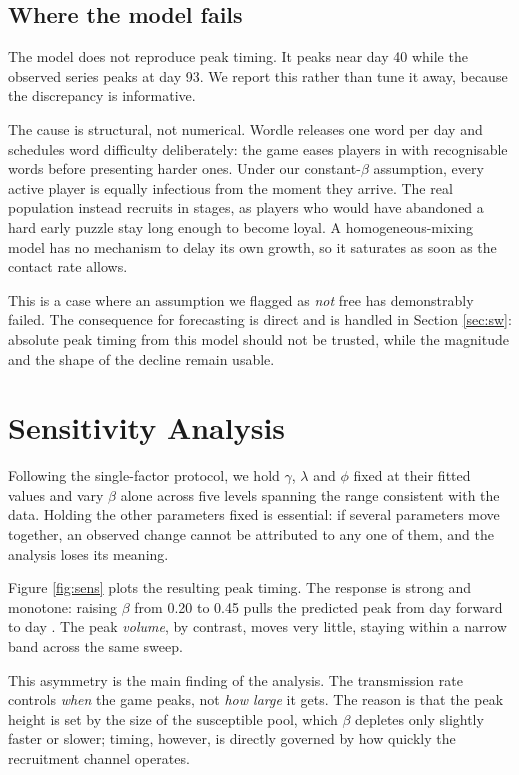 \documentclass[12pt]{article}
\begin{document}
\subsection{Where the model fails}

The model does not reproduce peak timing. It peaks near day 40 while the
observed series peaks at day 93. We report this rather than tune it away,
because the discrepancy is informative.

The cause is structural, not numerical. Wordle releases one word per day and
schedules word difficulty deliberately: the game eases players in with
recognisable words before presenting harder ones. Under our constant-$\beta$
assumption, every active player is equally infectious from the moment they
arrive. The real population instead recruits in stages, as players who would
have abandoned a hard early puzzle stay long enough to become loyal. A
homogeneous-mixing model has no mechanism to delay its own growth, so it
saturates as soon as the contact rate allows.

This is a case where an assumption we flagged as \emph{not} free has
demonstrably failed. The consequence for forecasting is direct and is handled
in Section \ref{sec:sw}: absolute peak timing from this model should not be
trusted, while the magnitude and the shape of the decline remain usable.

\section{Sensitivity Analysis}\label{sec:SEC-060}
Following the single-factor protocol, we hold $\gamma$, $\lambda$ and $\phi$
fixed at their fitted values and vary $\beta$ alone across five levels
spanning the range consistent with the data. Holding the other parameters
fixed is essential: if several parameters move together, an observed change
cannot be attributed to any one of them, and the analysis loses its meaning.

Figure \ref{fig:sens} plots the resulting peak timing. The response is strong
and monotone: raising $\beta$ from 0.20 to 0.45 pulls the predicted peak from
day 
\numPeakDayBetaZeroTwoZero{} forward to day 
\numPeakDayBetaZeroFourFive{}. The peak
\emph{volume}, by contrast, moves very little, staying within a narrow band
across the same sweep.

This asymmetry is the main finding of the analysis. The transmission rate
controls \emph{when} the game peaks, not \emph{how large} it gets. The reason is
that the peak height is set by the size of the susceptible pool, which $\beta$
depletes only slightly faster or slower; timing, however, is directly governed
by how quickly the recruitment channel operates.
\end{document}
